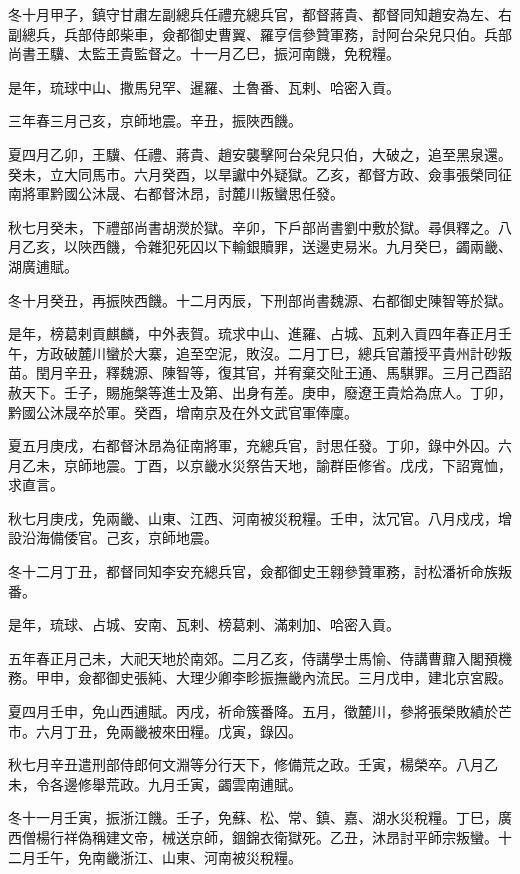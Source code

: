 \begin{pinyinscope}
冬十月甲子，鎮守甘肅左副總兵任禮充總兵官，都督蔣貴、都督同知趙安為左、右副總兵，兵部侍郎柴車，僉都御史曹翼、羅亨信參贊軍務，討阿台朵兒只伯。兵部尚書王驥、太監王貴監督之。十一月乙巳，振河南饑，免稅糧。

是年，琉球中山、撒馬兒罕、暹羅、土魯番、瓦剌、哈密入貢。

三年春三月己亥，京師地震。辛丑，振陜西饑。

夏四月乙卯，王驥、任禮、蔣貴、趙安襲擊阿台朵兒只伯，大破之，追至黑泉還。癸未，立大同馬市。六月癸酉，以旱讞中外疑獄。乙亥，都督方政、僉事張榮同征南將軍黔國公沐晟、右都督沐昂，討麓川叛蠻思任發。

秋七月癸未，下禮部尚書胡濙於獄。辛卯，下戶部尚書劉中敷於獄。尋俱釋之。八月乙亥，以陜西饑，令雜犯死囚以下輸銀贖罪，送邊吏易米。九月癸巳，蠲兩畿、湖廣逋賦。

冬十月癸丑，再振陜西饑。十二月丙辰，下刑部尚書魏源、右都御史陳智等於獄。

是年，榜葛剌貢麒麟，中外表賀。琉求中山、進羅、占城、瓦剌入貢四年春正月壬午，方政破麓川蠻於大寨，追至空泥，敗沒。二月丁巳，總兵官蕭授平貴州計砂叛苗。閏月辛丑，釋魏源、陳智等，復其官，并宥棄交阯王通、馬騏罪。三月己酉詔赦天下。壬子，賜施槃等進士及第、出身有差。庚申，廢遼王貴烚為庶人。丁卯，黔國公沐晟卒於軍。癸酉，增南京及在外文武官軍俸廩。

夏五月庚戌，右都督沐昂為征南將軍，充總兵官，討思任發。丁卯，錄中外囚。六月乙未，京師地震。丁酉，以京畿水災祭告天地，諭群臣修省。戊戌，下詔寬恤，求直言。

秋七月庚戌，免兩畿、山東、江西、河南被災稅糧。壬申，汰冗官。八月戍戌，增設沿海備倭官。己亥，京師地震。

冬十二月丁丑，都督同知李安充總兵官，僉都御史王翱參贊軍務，討松潘祈命族叛番。

是年，琉球、占城、安南、瓦剌、榜葛剌、滿剌加、哈密入貢。

五年春正月己未，大祀天地於南郊。二月乙亥，侍講學士馬愉、侍講曹鼐入閣預機務。甲申，僉都御史張純、大理少卿李畛振撫畿內流民。三月戊申，建北京宮殿。

夏四月壬申，免山西逋賦。丙戌，祈命簇番降。五月，徵麓川，參將張榮敗績於芒市。六月丁丑，免兩畿被來田糧。戊寅，錄囚。

秋七月辛丑遣刑部侍郎何文淵等分行天下，修備荒之政。壬寅，楊榮卒。八月乙未，令各邊修舉荒政。九月壬寅，蠲雲南逋賦。

冬十一月壬寅，振浙江饑。壬子，免蘇、松、常、鎮、嘉、湖水災稅糧。丁巳，廣西僧楊行祥偽稱建文帝，械送京師，錮錦衣衛獄死。乙丑，沐昂討平師宗叛蠻。十二月壬午，免南畿浙江、山東、河南被災稅糧。


\end{pinyinscope}
